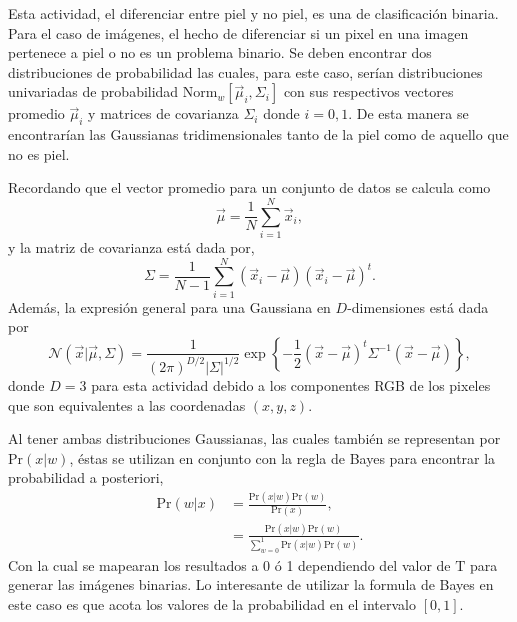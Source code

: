 Esta actividad, el diferenciar entre piel y no piel, es una de clasificación binaria. Para el caso de imágenes, el hecho de diferenciar si un pixel en una imagen pertenece a piel o no es un problema binario. Se deben encontrar dos distribuciones de probabilidad las cuales, para este caso, serían distribuciones univariadas de probabilidad $\text{Norm}_{w} [\vec\mu_i, \Sigma_i]$ con sus respectivos vectores promedio $\vec\mu_i$ y matrices de covarianza $\Sigma_i$ donde $i = 0, 1$. De esta manera se encontrarían las Gaussianas tridimensionales tanto de la piel como de aquello que no es piel.

Recordando que el vector promedio para un conjunto de datos se calcula como
\begin{equation*}
    \vec\mu = \frac{1}{N} \sum\limits_{i=1}^{N} \vec{x}_i ,
\end{equation*}
y la matriz de covarianza está dada por,
\begin{equation*}
    \Sigma = \frac{1}{N - 1} \sum\limits_{i=1}^{N} \left(\vec{x}_i - \vec{\mu}\right) \left(\vec{x}_i - \vec{\mu}\right)^t .
\end{equation*}
Además, la expresión general para una Gaussiana en $D$-dimensiones está dada por
\begin{equation*}
    \mathcal{N}(\vec{x}|\vec{\mu}, \Sigma) = \frac{1}{(2 \pi)^{D/2} |\Sigma|^{1/2}} \exp\left\{-\frac{1}{2} (\vec{x} - \vec{\mu})^{t} \Sigma^{-1} (\vec{x} - \vec{\mu}) \right\} ,
\end{equation*}
donde $D=3$ para esta actividad debido a los componentes RGB de los pixeles que son equivalentes a las coordenadas $(x, y, z)$.

Al tener ambas distribuciones Gaussianas, las cuales también se representan por $\text{Pr}(x | w)$, éstas se utilizan en conjunto con la regla de Bayes para encontrar la probabilidad a posteriori,
\begin{align*}
    \text{Pr}(w | x) & = \frac{\text{Pr}(x | w) \text{Pr}(w)}{\text{Pr}(x)} ,\\
    & = \frac{\text{Pr}(x | w) \text{Pr}(w)}{\sum\limits_{w=0}^{1} \text{Pr}(x | w) \text{Pr}(w)} .
\end{align*}
Con la cual se mapearan los resultados a 0 ó 1 dependiendo del valor de $\text{T}$ para generar las imágenes binarias. Lo interesante de utilizar la formula de Bayes en este caso es que acota los valores de la probabilidad en el intervalo $[0,1]$.

